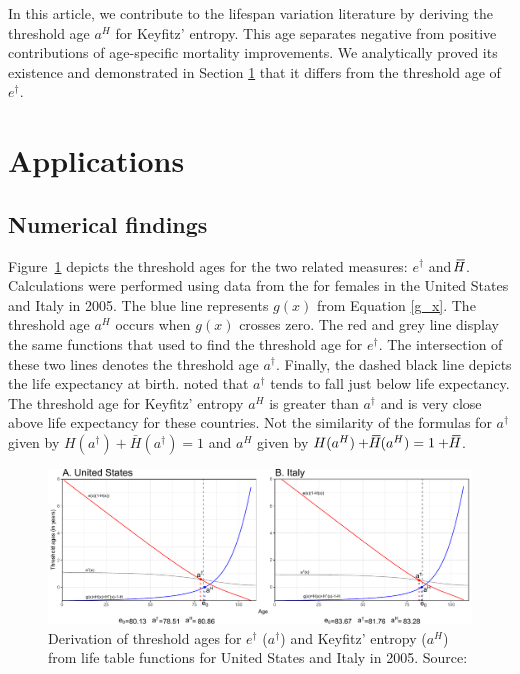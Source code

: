 \documentclass[a4paper,twoside, openright, 12pt, leqno]{article}
\newcommand*\xbar[1]{%
   \hbox{%
     \vbox{%
       \hrule height 0.5pt %
       \kern0.3ex%
       \hbox{%
         \kern-0.25em%
         \ensuremath{#1}%
         \kern-0.05em%
       }%
     }%
   }%
}
\begin{document}
 In this article, we contribute to the lifespan variation literature by deriving the threshold age $a^H$ for Keyfitz' entropy. This age separates negative from positive contributions of age-specific mortality improvements. We analytically proved its existence and demonstrated in Section \ref{sec:application} that it differs from the threshold age of $e^\dagger$.


\section{Applications}
\label{sec:application}

\subsection{Numerical findings}

Figure~\ref{fig:Fig1} depicts the threshold ages for the two related measures: $e^\dagger$ and $\xbar{H}$. Calculations were performed using data from the \citet{HMD} for females in the United States and Italy in 2005. The blue line represents $g(x)$ from Equation \eqref{g_x}. The threshold age $a^H$ occurs when  $g(x)$ crosses zero. The red and grey line display the same functions that \cite{Zhang2009} used to find the threshold age for $e^\dagger$. The intersection of these two lines denotes the threshold age $a^\dagger$. Finally, the dashed black line depicts the life expectancy at birth. \citet{Vaupel2011} noted that $a^\dagger$ tends to fall just below life expectancy. The threshold age for Keyfitz' entropy $a^H$ is greater than $a^\dagger$ and is very close above life expectancy for these countries. Not the similarity of the formulas for $a^\dagger$ given by $H(a^\dagger)+ \bar{H}(a^\dagger)=1$ and $a^H$ given by $H(a^H)+ \xbar{H}(a^H)= 1+\xbar{H}$.

\begin{figure}[h]
  \centering
  \includegraphics[scale=.72]{Ages2005}
  \caption{Derivation of threshold ages for $e^\dagger$ ($a^\dagger$) and Keyfitz' entropy ($a^H$) from life table functions for United States and Italy in 2005. Source: \cite{HMD}}
  \label{fig:Fig1}
\end{figure}
\end{document}
